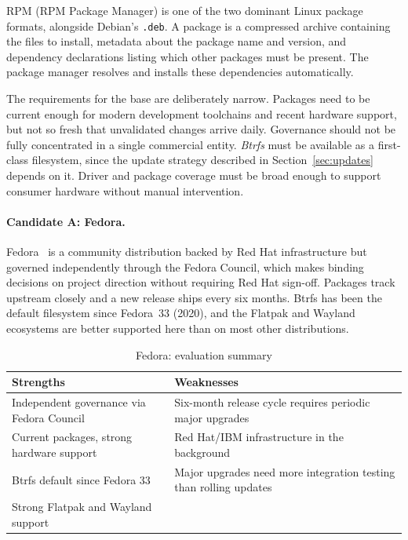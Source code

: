 RPM (RPM Package Manager) is one of the two dominant Linux package formats,
alongside Debian's \texttt{.deb}. A package is a compressed archive containing
the files to install, metadata about the package name and version, and dependency
declarations listing which other packages must be present. The package manager
resolves and installs these dependencies automatically.

The requirements for the base are deliberately narrow. Packages need to be
current enough for modern development toolchains and recent hardware support,
but not so fresh that unvalidated changes arrive daily. Governance should not
be fully concentrated in a single commercial entity. \emph{Btrfs} must be
available as a first-class filesystem, since the update strategy described in
Section~\ref{sec:updates} depends on it. Driver and package coverage must be
broad enough to support consumer hardware without manual intervention.

\paragraph{Candidate A: Fedora.}
Fedora~\cite{fedora} is a community distribution
backed by Red Hat infrastructure but governed independently through the Fedora
Council, which makes binding decisions on project direction without requiring
Red Hat sign-off. Packages track upstream closely and a new release ships every
six months. Btrfs has been the default filesystem since Fedora~33 (2020), and
the Flatpak and Wayland ecosystems are better supported here than on most other
distributions.

\begin{table}[htbp]
\caption{Fedora: evaluation summary}
\label{tab:fedora}
\begin{tabularx}{\linewidth}{XX}
\toprule
\textbf{Strengths} & \textbf{Weaknesses} \\
\midrule
Independent governance via Fedora Council &
  Six-month release cycle requires periodic major upgrades \\
Current packages, strong hardware support &
  Red Hat/IBM infrastructure in the background \\
Btrfs default since Fedora 33 &
  Major upgrades need more integration testing than rolling updates \\
Strong Flatpak and Wayland support & \\
\bottomrule
\end{tabularx}
\end{table}

